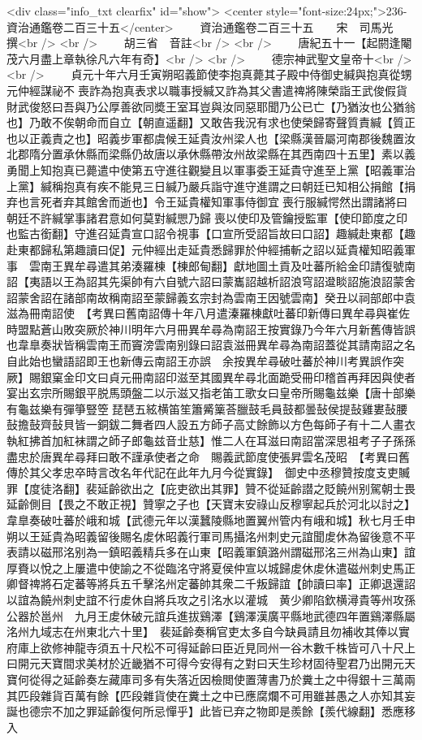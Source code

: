<div class="info_txt clearfix" id="show">
<center style="font-size:24px;">236-資治通鑑卷二百三十五</center>
  　　資治通鑑卷二百三十五　　宋　司馬光　撰<br />
<br />
　　胡三省　音註<br />
<br />
　　唐紀五十一【起閼逢閹茂六月盡上章執徐凡六年有奇】<br />
<br />
　　德宗神武聖文皇帝十<br />
<br />
　　貞元十年六月壬寅朔昭義節使李抱真薨其子殿中侍御史緘與抱真從甥元仲經謀祕不喪詐為抱真表求以職事授緘又詐為其父書遣禆將陳榮詣王武俊假貨財武俊怒曰吾與乃公厚善欲同奬王室耳豈與汝同惡耶聞乃公已亡【乃猶汝也公猶翁也】乃敢不俟朝命而自立【朝直遥翻】又敢告我況有求也使榮歸寄聲質責緘【質正也以正義責之也】昭義步軍都虞候王延貴汝州梁人也【梁縣漢晉屬河南郡後魏置汝北郡隋分置承休縣而梁縣仍故唐以承休縣帶汝州故梁縣在其西南四十五里】素以義勇聞上知抱真已薨遣中使第五守進往觀變且以軍事委王延貴守進至上黨【昭義軍治上黨】緘稱抱真有疾不能見三日緘乃嚴兵詣守進守進謂之曰朝廷已知相公捐館【捐弃也言死者弃其館舍而逝也】令王延貴權知軍事侍御宜喪行服緘愕然出謂諸將曰朝廷不許緘掌事諸君意如何莫對緘愳乃歸喪以使印及管鑰授監軍【使印節度之印也監古銜翻】守進召延貴宣口詔令視事【口宣所受詔旨故曰口詔】趣緘赴東都【趣赴東都歸私第趣讀曰促】元仲經出走延貴悉歸罪於仲經捕斬之詔以延貴權知昭義軍事　雲南王異牟尋遣其弟湊羅棟【棟郎甸翻】獻地圖土貢及吐蕃所給金印請復號南詔【夷語以王為詔其先渠帥有六自號六詔曰蒙巂詔越析詔浪穹詔邆睒詔施浪詔蒙舍詔蒙舍詔在諸部南故稱南詔至蒙歸義玄宗封為雲南王因號雲南】癸丑以祠部郎中袁滋為冊南詔使　【考異曰舊南詔傳十年八月遣溱羅棟獻吐蕃印新傳曰異牟尋與崔佐時盟點蒼山敗突厥於神川明年六月冊異牟尋為南詔王按實錄乃今年六月新舊傳皆誤也韋臯奏狀皆稱雲南王而竇滂雲南别錄曰詔袁滋冊異牟尋為南詔蓋從其請南詔之名自此始也蠻語詔即王也新傳云南詔王亦誤　余按異牟尋破吐蕃於神川考異誤作突厥】賜銀窠金印文曰貞元冊南詔印滋至其國異牟尋北面跪受冊印稽首再拜因與使者宴出玄宗所賜銀平脱馬頭盤二以示滋又指老笛工歌女曰皇帝所賜龜兹樂【唐十部樂有龜兹樂有彈箏豎箜琵琶五絃横笛笙簫觱篥荅臘鼓毛員鼓都曇鼔侯提鼔雞婁鼔腰鼔擔鼔齊鼔貝皆一銅鈸二舞者四人設五方師子高丈餘飾以方色每師子有十二人畫衣執紅拂首加紅袜謂之師子郎龜兹音㐀慈】惟二人在耳滋曰南詔當深思祖考子子孫孫盡忠於唐異牟尋拜曰敢不謹承使者之命　賜義武節度使張昇雲名茂昭　【考異曰舊傳於其父孝忠卒時言改名年代記在此年九月今從實錄】　御史中丞穆贊按度支吏贓罪【度徒洛翻】裴延齡欲出之【庇吏欲出其罪】贊不從延齡譛之貶饒州别駕朝士畏延齡側目【畏之不敢正視】贊寧之子也【天寶末安祿山反穆寧起兵於河北以討之】韋臯奏破吐蕃於峨和城【武德元年以漢蠶陵縣地置翼州管内有峨和城】秋七月壬申朔以王延貴為昭義留後賜名䖍休昭義行軍司馬攝洺州刺史元誼聞䖍休為留後意不平表請以磁邢洺别為一鎮昭義精兵多在山東【昭義軍鎮潞州謂磁邢洺三州為山東】誼厚賚以悅之上屢遣中使諭之不從臨洺守將夏侯仲宣以城歸䖍休䖍休遣磁州刺史馬正卿督禆將石定蕃等將兵五千擊洺州定蕃帥其衆二千叛歸誼【帥讀曰率】正卿退還詔以誼為饒州刺史誼不行䖍休自將兵攻之引洺水以灌城　黄少卿陷欽横潯貴等州攻孫公器於邕州　九月王䖍休破元誼兵進拔鷄澤【鷄澤漢廣平縣地武德四年置鷄澤縣屬洺州九域志在州東北六十里】　裴延齡奏稱官吏太多自今缺員請且勿補收其俸以實府庫上欲修神龍寺須五十尺松不可得延齡曰臣近見同州一谷木數千株皆可八十尺上曰開元天寶間求美材於近畿猶不可得今安得有之對曰天生珍材固待聖君乃出開元天寶何從得之延齡奏左藏庫司多有失落近因檢閲使置薄書乃於糞土之中得銀十三萬兩其匹段雜貨百萬有餘【匹段雜貨使在糞土之中已應腐爛不可用雖甚愚之人亦知其妄誕也德宗不加之罪延齡復何所忌憚乎】此皆已弃之物即是羨餘【羨代線翻】悉應移入
